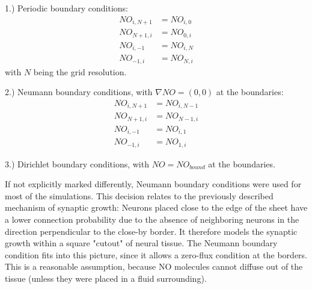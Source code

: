 \documentclass[10pt,a4paper]{article}
\begin{document}
1.) Periodic boundary conditions:
\begin{align}
NO_{i,N+1} &= NO_{i,0} \label{Periodic_Cond_1} \\
NO_{N+1,i} &= NO_{0,i} \label{Periodic_Cond_2} \\
NO_{i,-1} &= NO_{i,N} \label{Periodic_Cond_3} \\
NO_{-1,i} &= NO_{N,i} \label{Periodic_Cond_4}
\end{align}
with $N$ being the grid resolution.

2.) Neumann boundary conditions, with $\nabla NO = (0,0)$ at the boundaries:
\begin{align}
NO_{i,N+1} &= NO_{i,N-1} \label{Neumann_Cond_1} \\
NO_{N+1,i} &= NO_{N-1,i} \label{Neumann_Cond_2} \\
NO_{i,-1} &= NO_{i,1} \label{Neumann_Cond_3} \\
NO_{-1,i} &= NO_{1,i} \label{Neumann_Cond_4}
\end{align}

3.) Dirichlet boundary conditions, with $NO = NO_{bound}$ at the boundaries.

If not explicitly marked differently, Neumann boundary conditions were used for most of the simulations. This decision relates to the previously described mechanism of synaptic growth: Neurons placed close to the edge of the sheet have a lower connection probability due to the absence of neighboring neurons in the direction perpendicular to the close-by border. It therefore models the synaptic growth within a square "cutout" of neural tissue. The Neumann boundary condition fits into this picture, since it allows a zero-flux condition at the borders. This is a reasonable assumption, because NO molecules cannot diffuse out of the tissue (unless they were placed in a fluid surrounding).
\end{document}
